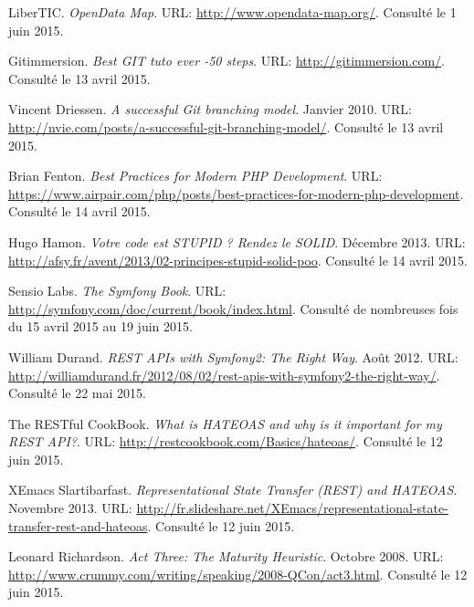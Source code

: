 
\renewcommand{\refname}{Webographie}

\begin{thebibliography}{ABC}

     LiberTIC. \emph{OpenData Map}. URL: \url{http://www.opendata-map.org/}. Consulté le 1 juin 2015.

     Gitimmersion. \emph{Best GIT tuto ever -50 steps}. URL: \url{http://gitimmersion.com/}. Consulté le 13 avril 2015.

     Vincent Driessen. \emph{A successful Git branching model}. Janvier 2010. URL: \url{http://nvie.com/posts/a-successful-git-branching-model/}. Consulté le 13 avril 2015.

     Brian Fenton. \emph{Best Practices for Modern PHP Development}. URL: \url{https://www.airpair.com/php/posts/best-practices-for-modern-php-development}. Consulté le 14 avril 2015.

     Hugo Hamon. \emph{Votre code est STUPID ? Rendez le SOLID}. Décembre 2013. URL: \url{http://afsy.fr/avent/2013/02-principes-stupid-solid-poo}. Consulté le 14 avril 2015.

     Sensio Labs. \emph{The Symfony Book}. URL: \url{http://symfony.com/doc/current/book/index.html}. Consulté de nombreuses fois du 15 avril 2015 au 19 juin 2015.

     William Durand. \emph{REST APIs with Symfony2: The Right Way}. Août 2012. URL: \url{http://williamdurand.fr/2012/08/02/rest-apis-with-symfony2-the-right-way/}. Consulté le 22 mai 2015.

     The RESTful CookBook. \emph{What is HATEOAS and why is it important for my REST API?}. URL: \url{http://restcookbook.com/Basics/hateoas/}. Consulté le 12 juin 2015.

     XEmacs Slartibarfast. \emph{Representational State Transfer (REST) and HATEOAS}. Novembre 2013. URL: \url{http://fr.slideshare.net/XEmacs/representational-state-transfer-rest-and-hateoas}. Consulté le 12 juin 2015.

     Leonard Richardson. \emph{Act Three: The Maturity Heuristic}. Octobre 2008. URL: \url{http://www.crummy.com/writing/speaking/2008-QCon/act3.html}. Consulté le 12 juin 2015.

    \setcounter{firstbib}{\value{enumiv}}
\end{thebibliography}

